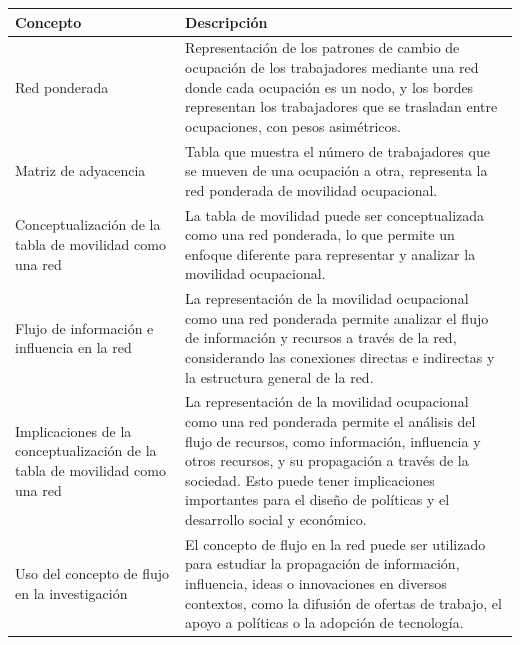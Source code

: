 \begin{table}[H]
\centering
\begin{tabularx}{\textwidth}{p{5cm}|p{9cm}}
\hline
\textbf{Concepto} & \textbf{Descripción} \\
\hline
Red ponderada & Representación de los patrones de cambio de ocupación de los trabajadores mediante una red donde cada ocupación es un nodo, y los bordes representan los trabajadores que se trasladan entre ocupaciones, con pesos asimétricos. \\
\hline
Matriz de adyacencia & Tabla que muestra el número de trabajadores que se mueven de una ocupación a otra, representa la red ponderada de movilidad ocupacional. \\
\hline
Conceptualización de la tabla de movilidad como una red & La tabla de movilidad puede ser conceptualizada como una red ponderada, lo que permite un enfoque diferente para representar y analizar la movilidad ocupacional. \\
\hline
Flujo de información e influencia en la red & La representación de la movilidad ocupacional como una red ponderada permite analizar el flujo de información y recursos a través de la red, considerando las conexiones directas e indirectas y la estructura general de la red. \\
\hline
Implicaciones de la conceptualización de la tabla de movilidad como una red & La representación de la movilidad ocupacional como una red ponderada permite el análisis del flujo de recursos, como información, influencia y otros recursos, y su propagación a través de la sociedad. Esto puede tener implicaciones importantes para el diseño de políticas y el desarrollo social y económico. \\
\hline
Uso del concepto de flujo en la investigación & El concepto de flujo en la red puede ser utilizado para estudiar la propagación de información, influencia, ideas o innovaciones en diversos contextos, como la difusión de ofertas de trabajo, el apoyo a políticas o la adopción de tecnología. \\
\hline
\end{tabularx}
\end{table}



